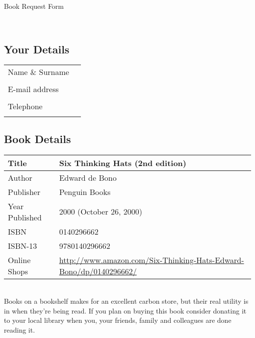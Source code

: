 \documentclass [fleqn,12pt]{article}
\begin{document}
\begin{center}
{\huge Book Request Form}
\end{center}

\ \\

\subsection*{Your Details}

\begin{tabular}{|l|l|} \hline
Name \& Surname & \;\;\;\;\;\;\;\;\;\;\;\;\;\;\;\;\;\;\;\;\;\;\;\;\;\;\;\;\;\;\;\;\;\;\;\;\;\;\;\;\;\;\;\;\;\;\;\;\;\;\;\;\;\;\;\;\;\;\;\;\;\;\;\;\;\;\;\;\;\;\;\;\;\;\;\;\;\;\;\;\;\;\;\;\;\;\;\;\;\;\;\; \\
& \\ \hline
E-mail address & \\
& \\ \hline
Telephone & \\
& \\ \hline
\end{tabular}

\subsection*{Book Details}

\begin{tabular}{|l|l|} \hline
Title \;\;\;\;\;\;\;\;\;\;\;\;\;\;\;\;\;\;\; & Six Thinking Hats (2nd edition) \;\;\;\;\;\;\;\;\;\;\;\;\;\;\;\;\;\;\;\;\;\;\;\;\;\;\;\;\;\;\;\;\;\;\;\;\;\;\;\; \\ \hline
Author & Edward de Bono \\ \hline
Publisher & Penguin Books \\ \hline
Year Published & 2000 (October 26, 2000) \\ \hline
ISBN & 0140296662 \\ \hline
ISBN-13 & 9780140296662 \\ \hline
Online Shops & \href{http://www.amazon.com/Six-Thinking-Hats-Edward-Bono/dp/0140296662/}{\parbox{100mm}{http://www.amazon.com/Six-Thinking-Hats-Edward-Bono/dp/0140296662/}} \\ \hline
\end{tabular}

\ \\[1em]

Books on a bookshelf makes for an excellent carbon store, but their real
utility is in when they're being read. If you plan on buying this book
consider donating it to your local library when you, your friends, family
and colleagues are done reading it.
\end{document}
